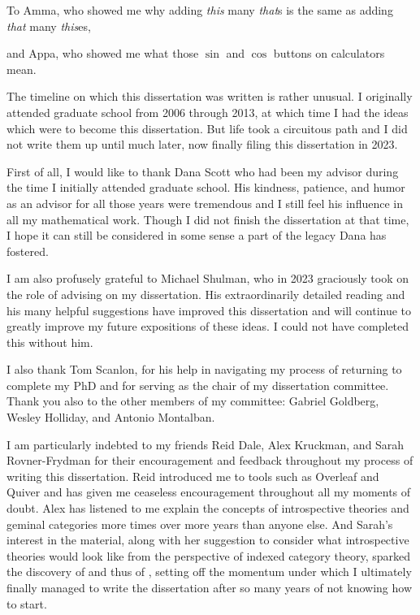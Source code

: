 \documentclass{ucbthesis}
\begin{document}
\begin{frontmatter}

\begin{dedication}
\null\vfil
\begin{center}
To Amma, who showed me why adding \textit{this} many \textit{that}s is the same as adding \textit{that} many \textit{this}es,
\\\vspace{12pt}

and Appa, who showed me what those $\sin$ and $\cos$ buttons on calculators mean.

\end{center}
\vfil\null
\end{dedication}

\begin{acknowledgements}
The timeline on which this dissertation was written is rather unusual. I originally attended graduate school from 2006 through 2013, at which time I had the ideas which were to become this dissertation. But life took a circuitous path and I did not write them up until much later, now finally filing this dissertation in 2023.

First of all, I would like to thank Dana Scott who had been my advisor during the time I initially attended graduate school. His kindness, patience, and humor as an advisor for all those years were tremendous and I still feel his influence in all my mathematical work. Though I did not finish the dissertation at that time, I hope it can still be considered in some sense a part of the legacy Dana has fostered.

I am also profusely grateful to Michael Shulman, who in 2023 graciously took on the role of advising on my dissertation. His extraordinarily detailed reading and his many helpful suggestions have improved this dissertation and will continue to greatly improve my future expositions of these ideas. I could not have completed this without him.

I also thank Tom Scanlon, for his help in navigating my process of returning to complete my PhD and for serving as the chair of my dissertation committee. Thank you also to the other members of my committee: Gabriel Goldberg, Wesley Holliday, and Antonio Montalban.

I am particularly indebted to my friends Reid Dale, Alex Kruckman, and Sarah Rovner-Frydman for their encouragement and feedback throughout my process of writing this dissertation. Reid introduced me to tools such as Overleaf and Quiver and has given me ceaseless encouragement throughout all my moments of doubt. Alex has listened to me explain the concepts of introspective theories and geminal categories more times over more years than anyone else. And Sarah's interest in the material, along with her suggestion to consider what introspective theories would look like from the perspective of indexed category theory, sparked the discovery of  and thus of , setting off the momentum under which I ultimately finally managed to write the dissertation after so many years of not knowing how to start.


\end{acknowledgements}
\end{frontmatter}
\end{document}
